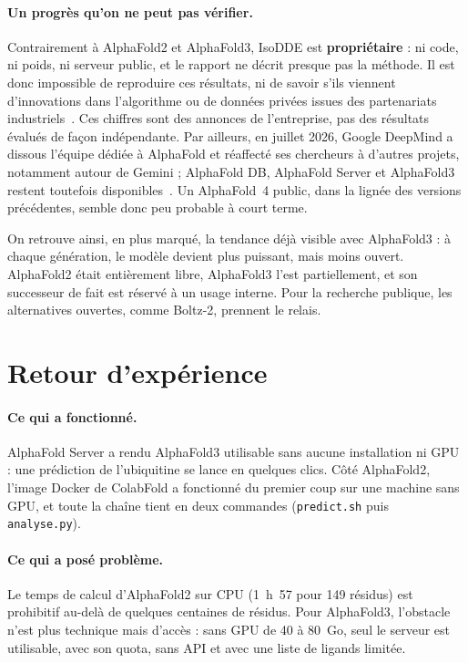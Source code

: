 \paragraph{Un progrès qu'on ne peut pas vérifier.} Contrairement à AlphaFold2 et AlphaFold3, IsoDDE est \textbf{propriétaire} : ni code, ni poids, ni serveur public, et le rapport ne décrit presque pas la méthode. Il est donc impossible de reproduire ces résultats, ni de savoir s'ils viennent d'innovations dans l'algorithme ou de données privées issues des partenariats industriels~\cite{callaway2026}. Ces chiffres sont des annonces de l'entreprise, pas des résultats évalués de façon indépendante. Par ailleurs, en juillet 2026, Google DeepMind a dissous l'équipe dédiée à AlphaFold et réaffecté ses chercheurs à d'autres projets, notamment autour de Gemini ; AlphaFold DB, AlphaFold Server et AlphaFold3 restent toutefois disponibles~\cite{gigazine2026}. Un AlphaFold~4 public, dans la lignée des versions précédentes, semble donc peu probable à court terme.

On retrouve ainsi, en plus marqué, la tendance déjà visible avec AlphaFold3 : à chaque génération, le modèle devient plus puissant, mais moins ouvert. AlphaFold2 était entièrement libre, AlphaFold3 l'est partiellement, et son successeur de fait est réservé à un usage interne. Pour la recherche publique, les alternatives ouvertes, comme Boltz-2, prennent le relais.

\section{Retour d'expérience}

\paragraph{Ce qui a fonctionné.} AlphaFold Server a rendu AlphaFold3 utilisable sans aucune installation ni GPU : une prédiction de l'ubiquitine se lance en quelques clics. Côté AlphaFold2, l'image Docker de ColabFold a fonctionné du premier coup sur une machine sans GPU, et toute la chaîne tient en deux commandes (\texttt{predict.sh} puis \texttt{analyse.py}).

\paragraph{Ce qui a posé problème.} Le temps de calcul d'AlphaFold2 sur CPU (1~h~57 pour 149 résidus) est prohibitif au-delà de quelques centaines de résidus. Pour AlphaFold3, l'obstacle n'est plus technique mais d'accès : sans GPU de 40 à 80~Go, seul le serveur est utilisable, avec son quota, sans API et avec une liste de ligands limitée.

